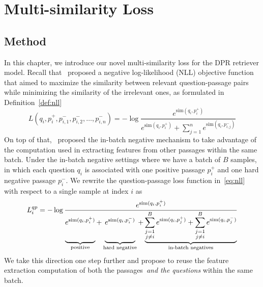 
\chapter{Multi-similarity Loss} %
\label{ch:multi_similarity}


\section{Method}
\label{sec:multi_similarity_method}


%
In this chapter, we introduce our novel multi-similarity loss for the DPR retriever model.
%
Recall that~\citet{karpukhin2020dense} proposed a negative log-likelihood (NLL) objective function that aimed to maximize the similarity between relevant question-passage pairs while minimizing the similarity of the irrelevant ones, as formulated in Definition~\ref{def:nll}
%
\begin{equation}
\label{eq:nll}
L(q_i, p^{+}_i, p^{-}_{i, 1}, p^{-}_{i, 2}, \ldots, p^{-}_{i, n}) = - \log \frac{e^{\text{sim}(q_i, p^{+}_i)}}{e^{\text{sim}(q_i, p^{+}_i)} + \sum_{j = 1}^{n} e^{\text{sim}(q_i, p^{-}_{i, j})}}
\end{equation}
%
On top of that,~\citet{karpukhin2020dense} proposed the in-batch negative mechanism to take advantage of the computation used in extracting features from other passages within the same batch.
%
Under the in-batch negative settings where we have a batch of $B$ samples, in which each question $q_i$ is associated with one positive passage $p^{+}_i$ and one hard negative passage $p^{-}_i$.
%
We rewrite the question-passage loss function in~\eqref{eq:nll}  with respect to a single sample at index $i$ as
%
\begin{equation}
\label{eq:nll_rewritten}
L^{qp}_i = - \log \frac{e^{\text{sim}(q_i, p^{+}_i)}}{
	\underbrace{
		\vphantom{\sum_{\substack{j = 1 \\ j \neq i}}^{B} e^{\text{sim}(q_i, p^{+}_j)}}
		e^{\text{sim}(q_i, p^{+}_i)}
	}_{\text{positive}} +
	\underbrace{
		\vphantom{\sum_{\substack{j = 1 \\ j \neq i}}^{B} e^{\text{sim}(q_i, p^{+}_j)}}
		e^{\text{sim}(q_i, p^{-}_i)}
	}_{\text{hard negative}} +
	\underbrace{
		\sum_{\substack{j = 1 \\ j \neq i}}^{B} e^{\text{sim}(q_i, p^{+}_j)} + 
		\sum_{\substack{j = 1 \\ j \neq i}}^{B} e^{\text{sim}(q_i, p^{-}_j)}
	}_{\text{in-batch negatives}}
}
\end{equation}
%
We take this direction one step further and propose to reuse the feature extraction computation of both the passages~\emph{and the questions} within the same batch.

